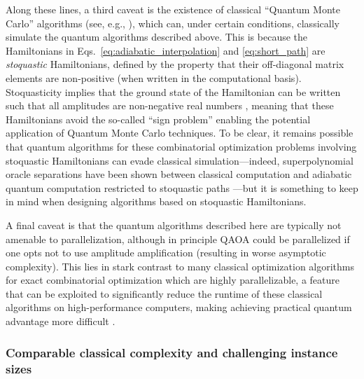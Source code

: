 \begin{refsection}
Along these lines, a third caveat is the existence of classical ``Quantum Monte Carlo'' algorithms (see, e.g., \cite{farhi2009smallGapsDifferentPaths,bravyi2015qmcStoquastic,jarret2016diffusionMonteCarlo,crosson2016simulatedQuantumAnnealing, crosson2020classicalSimulationIsingModels}), which can, under certain conditions, classically simulate the quantum algorithms described above. This is because the Hamiltonians in Eqs.~\eqref{eq:adiabatic_interpolation} and \eqref{eq:short_path} are \emph{stoquastic} Hamiltonians, defined by the property that their off-diagonal matrix elements are non-positive (when written in the computational basis). Stoquasticity implies that the ground state of the Hamiltonian can be written such that all amplitudes are non-negative real numbers \cite{bravyi2010ComplexityOfStoqFrustFreeHam}, meaning that these Hamiltonians avoid the so-called ``sign problem'' enabling the potential application of Quantum Monte Carlo techniques. To be clear, it remains possible that quantum algorithms for these combinatorial optimization problems involving stoquastic Hamiltonians can evade classical simulation---indeed, superpolynomial oracle separations have been shown between classical computation and adiabatic quantum computation restricted to stoquastic paths \cite{hastings2020PowerOfAdiabaticNoSign, gilyen2020ExpAdvAdiabStoqQC}---but it is something to keep in mind when designing algorithms based on stoquastic Hamiltonians.

A final caveat is that the quantum algorithms described here are typically not amenable to parallelization, although in principle QAOA could be parallelized if one opts not to use amplitude amplification (resulting in worse asymptotic complexity). This lies in stark contrast to many classical optimization algorithms for exact combinatorial optimization which are highly parallelizable, a feature that can be exploited to significantly reduce the runtime of these classical algorithms on high-performance computers, making achieving practical quantum advantage more difficult \cite{babbush2021FocusBeyondQuadratic}.


\subsubsection*{Comparable classical complexity and challenging instance sizes}


\end{refsection}
